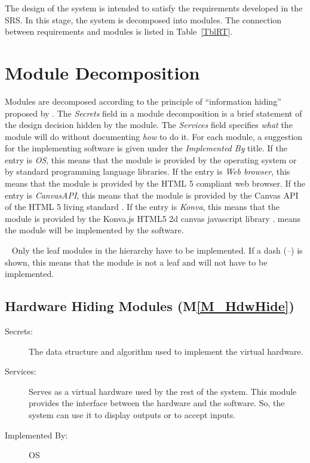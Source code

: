 \documentclass[12pt, titlepage]{article}
\newcommand{\mref}[1]{M\ref{#1}}
\begin{document}
The design of the system is intended to satisfy the requirements developed in
the SRS. In this stage, the system is decomposed into modules. The connection
between requirements and modules is listed in Table~\ref{TblRT}.

\section{Module Decomposition} \label{SecMD}

Modules are decomposed according to the principle of ``information hiding''
proposed by \citet{ParnasEtAl1984}. The \emph{Secrets} field in a module
decomposition is a brief statement of the design decision hidden by the
module. The \emph{Services} field specifies \emph{what} the module will do
without documenting \emph{how} to do it. For each module, a suggestion for the
implementing software is given under the \emph{Implemented By} title. If the
entry is \emph{OS}, this means that the module is provided by the operating
system or by standard programming language libraries.
If the entry is \emph{Web browser}, this means that the module is provided by the 
HTML 5 compliant web browser.
If the entry is \emph{CanvasAPI}, this means that the module is provided by the 
Canvas API of the HTML 5 living standard \cite{html_std_canvas}.
If the entry is \emph{Konva}, this means that the module is provided by the 
Konva.js HTML5 2d canvas javascript library \cite{konva_2021}.
\emph{\progname{}} means the module will be implemented by the \progname{} software.

~\newline
Only the leaf modules in the hierarchy have to be implemented. If a dash
(\emph{--}) is shown, this means that the module is not a leaf and will not have
to be implemented.

\subsection{Hardware Hiding Modules (\mref{M_HdwHide})}

\begin{description}
\item[Secrets:]The data structure and algorithm used to implement the virtual
  hardware.
\item[Services:]Serves as a virtual hardware used by the rest of the
  system. This module provides the interface between the hardware and the
  software. So, the system can use it to display outputs or to accept inputs.
\item[Implemented By:] OS
\end{description}
\end{document}
